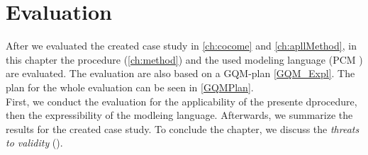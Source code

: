 
\chapter{Evaluation}
\label{ch:eval}
After we evaluated the created case study in \autoref{ch:cocome} and \autoref{ch:apllMethod}, in this chapter the procedure (\autoref{ch:method}) and the used modeling language (PCM \cite{PCM}) are evaluated. The evaluation are also based on a GQM-plan \autoref{GQM_Expl}. The plan for the whole evaluation can be seen in \autoref{GQMPlan}. \\ First, we conduct the evaluation for the applicability of the presente dprocedure, then the expressibility of the modleing language. Afterwards, we summarize the results for the created case study. To conclude the chapter, we discuss the \textit{threats to validity} (\cite{TtoV}).

